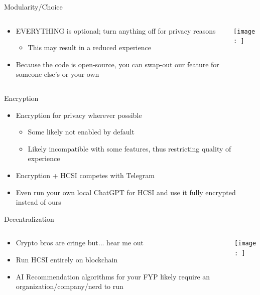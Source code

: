 \documentclass[aspectratio=169]{beamer}
\begin{document}
\begin{frame}{Modularity/Choice}
\begin{columns}[T]
    \begin{column}[T]{0.5\textwidth}
        \begin{itemize}
            \item EVERYTHING is optional; turn anything off for privacy reasons
            \begin{itemize}
                \item This may result in a reduced experience
            \end{itemize}
            \item Because the code is open-source, you can swap-out our feature for someone else's or your own
        \end{itemize}
    \end{column}
    \begin{column}{0.5\textwidth}
        \texttt{[image: ]}
    \end{column}
\end{columns}
\end{frame}

\begin{frame}{Encryption}
\begin{itemize}
    \item Encryption for privacy wherever possible
    \begin{itemize}
        \item Some likely not enabled by default
        \item Likely incompatible with some features, thus restricting quality of experience
    \end{itemize}
    \item Encryption + HCSI competes with Telegram
    \item Even run your own local ChatGPT for HCSI and use it fully encrypted instead of ours
\end{itemize}
\end{frame}

\begin{frame}{Decentralization}
\begin{columns}[T]
    \begin{column}[T]{0.5\textwidth}
        \begin{itemize}
            \item Crypto bros are cringe but... hear me out
            \item Run HCSI entirely on blockchain
            \item AI Recommendation algorithms for your FYP likely require an organization/company/nerd to run
        \end{itemize}
    \end{column}
    \begin{column}{0.5\textwidth}
        \texttt{[image: ]}
    \end{column}
\end{columns}
\end{frame}
\end{document}
